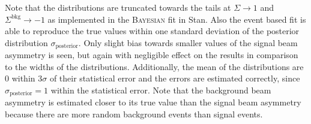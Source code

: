 Note that the distributions are truncated towards the tails at $\Sigma\to1$ and $\Sigma^\text{bkg}\to-1$ as implemented in the \textsc{Bayesian} fit in Stan. Also the event based fit is able to reproduce the true values within one standard deviation of the posterior distribution $\sigma_\text{posterior}$. Only slight bias towards smaller values of the signal beam asymmetry is seen, but again with negligible effect on the results in comparison to the widths of the distributions. Additionally, the mean of the distributions are 0 within $3\sigma$ of their statistical error and the errors are estimated correctly, since $\sigma_\text{posterior}=1$ within the statistical error. Note that the background beam asymmetry is estimated closer to its true value than the signal beam asymmetry because there are more random background events than signal events.

